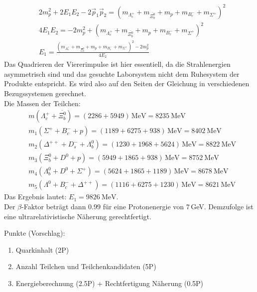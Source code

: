 \documentclass{exercise}
\begin{document}
{\begin{enumerate}
        \begin{align*}
        &2m_p^2 + 2E_1E_2-2\vec{p}_1\vec{p}_2 = (m_{\Lambda_c^+} + m_{\overline{\Xi^{0}_{b}}} + m_{p} + m_{B_{c}^-} + m_{\Sigma^+})^2\\
        &4E_1E_2 = - 2m_p^2 + (m_{\Lambda_c^+} + m_{\overline{\Xi^{0}_{b}}} + m_{p} + m_{B_{c}^-} + m_{\Sigma^+})^2\\
        &E_1 = \frac{(m_{\Lambda_c^+} + m_{\overline{\Xi^{0}_{b}}} + m_{p} + m_{B_{c}^-} + m_{\Sigma^+})^2 - 2m_p^2}{4E_2}
        \end{align*}
        Das Quadrieren der Viererimpulse ist hier essentiell, da die Strahlenergien asymmetrisch sind und das gesuchte Laborsystem nicht dem Ruhesystem der Produkte entspricht. Es wird also auf den Seiten der Gleichung in verschiedenen Bezugssystemen gerechnet.\\
        
        Die Massen der Teilchen:
        \begin{align*}
            &m(\Lambda_c^+ + \overline{\Xi^{0}_{b}}) = (2286 + 5949)\,\si{\mega\electronvolt}= \SI{8235}{\mega\electronvolt}  \\
            &m_1(\Sigma^+ + B_{c}^- + p) = (1189 + 6275 + 938)\,\si{\mega\electronvolt} = \SI{8402}{\mega\electronvolt} \\
            &m_2(\Delta^{++} + D_s^- + \Lambda_b^0) = (1230 + 1968 + 5624)\,\si{\mega\electronvolt} = \SI{8822}{\mega\electronvolt} \\
            &m_3(\Xi_b^0 + D^0 + p) = (5949 + 1865 + 938)\,\si{\mega\electronvolt} = \SI{8752}{\mega\electronvolt} \\
            &m_4(\Lambda_b^0 + D^0 + \Sigma^+) = (5624 + 1865 + 1189)\,\si{\mega\electronvolt} = \SI{8678}{\mega\electronvolt} \\
            &m_5(\Lambda^0 + B_{c}^- + \Delta^{++}) = (1116 + 6275 + 1230)\,\si{\mega\electronvolt} = \SI{8621}{\mega\electronvolt} 
        \end{align*}
        Das Ergebnis lautet: $E_1 = \SI{9826}{\mega\electronvolt}$. \\
        Der $\beta$-Faktor beträgt dann $0.99$ für eine Protonenergie von $7\,$GeV. Demzufolge ist eine ultrarelativistische Näherung gerechtfertigt. 
    
        \end{enumerate}
        Punkte (Vorschlag):
        \begin{enumerate}
        \item Quarkinhalt (2P)
        \item Anzahl Teilchen und Teilchenkandidaten (5P)\\
        \item Energieberechnung (2.5P) + Rechtfertigung Näherung (0.5P)
    \end{enumerate}
    }
\end{document}
